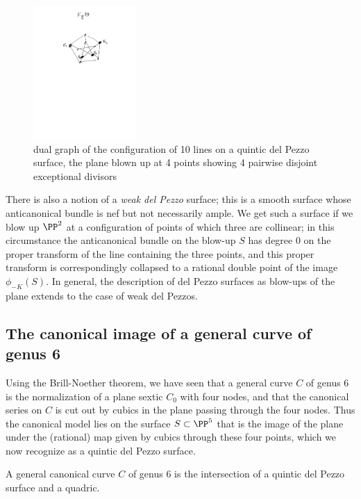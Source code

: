 \begin{figure}
\begin{center}
\centerline {\includegraphics[height=2in]{"Fig11.4.pdf"}}
\caption{dual graph of the configuration of 10 lines on a quintic del Pezzo surface, the plane blown up
at 4 points showing 4 pairwise disjoint exceptional divisors}
\label{dual graph of the configuration of 10 lines on a quintic del Pezzo surface}
\end{center}
\end{figure}

There is also a notion of a \emph{weak del Pezzo} surface; this is a smooth surface whose anticanonical bundle is nef but not necessarily ample. We get such a surface if we blow up $\PP^2$ at a configuration of points of which three are collinear; in this circumstance the anticanonical bundle on the blow-up $S$ has degree 0 on the proper transform of the line containing the three points, and this proper transform is correspondingly collapsed to a rational double point of the image $\phi_{-K}(S)$. In general, the description of del Pezzo surfaces as blow-ups of the plane extends to the case of weak del Pezzos.



\subsection{The canonical image of a general curve of genus 6}

Using the Brill-Noether theorem, we have seen that a general curve $C$ of genus 6 is the normalization of a plane sextic $C_0$ with four nodes, and that the canonical series on $C$ is cut out by cubics in the plane passing through the four nodes. Thus the canonical model lies on the surface $S \subset \PP^5$ that is the image of the plane under the (rational) map given by cubics through these four points, which we now recognize as a quintic del Pezzo surface.

\begin{theorem}
A general canonical curve $C$ of genus 6 is the intersection of a quintic del Pezzo surface and a quadric. 
\end{theorem}

